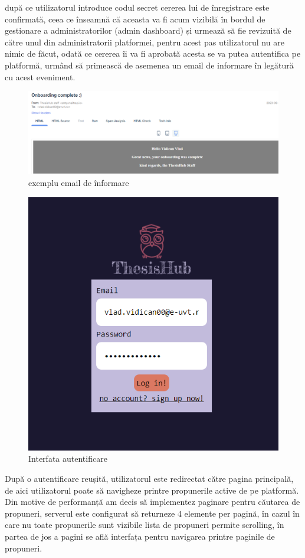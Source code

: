 \documentclass[12pt,a4paper,hidelinks]{report}
\theoremstyle{definition}
\theoremstyle{remark}
\begin{document}
după ce utilizatorul introduce codul secret cererea lui de înregistrare este confirmată, 
ceea ce înseamnă că aceasta va fi acum vizibilă în bordul de gestionare a administratorilor (admin dashboard)
și urmează să fie revizuită de către unul din administratorii platformei, pentru acest pas utilizatorul nu are nimic de făcut,
odată ce cererea îi va fi aprobată acesta se va putea autentifica pe platformă, urmând să primească de asemenea un email de informare în legătură cu acest eveniment.
\begin{figure}[H]
    \centering
    \includegraphics[scale=0.5]{images/OnboardingComplete.PNG}
    \caption{exemplu email de înformare}
\end{figure}
\begin{figure}[H]
    \centering
    \includegraphics[scale=0.5]{images/LoginForm.PNG}
    \caption{Interfata autentificare}
\end{figure}
După o autentificare reușită, utilizatorul este redirectat către pagina principală, 
de aici utilizatorul poate să navigheze printre propunerile active de pe platformă.
Din motive de performanță am decis să implementez paginare pentru căutarea de propuneri,
serverul este configurat să returneze 4 elemente per pagină, în cazul în care nu toate propunerile sunt vizibile 
lista de propuneri permite scrolling, în partea de jos a pagini se află interfața pentru navigarea printre paginile de propuneri. 
\end{document}
